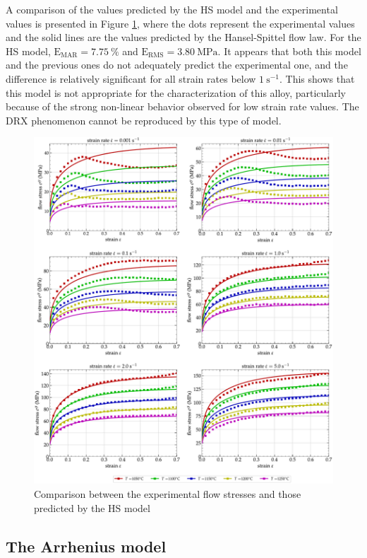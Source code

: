 \documentclass[twoside,english,1p,final,sort&compress]{elsarticle}
\theoremstyle{plain}
\DeclareRobustCommand{\RMSE}{\text{E}_\text{RMS}}
\DeclareRobustCommand{\MARE}{\text{E}_\text{MAR}}
\DeclareRobustCommand{\ps}{\text{s}^{-1}}
\DeclareRobustCommand{\MPa}{\text{MPa}}
\begin{document}
A comparison of the values predicted by the HS model and the experimental values is presented in Figure \ref{fig:CompExp-HS-6}, where the dots represent the experimental values and the solid lines are the values predicted by the Hansel-Spittel flow law.
For the HS model, $\MARE=7.75~\%$ and $\RMSE=3.80~\MPa$.
It appears that both this model and the previous ones do not adequately predict the experimental one, and the difference is relatively significant for all strain rates below $1~\ps$.
This shows that this model is not appropriate for the characterization of this alloy, particularly because of the strong non-linear behavior observed for low strain rate values.
The DRX phenomenon cannot be reproduced by this type of model.

\begin{figure}[!ht]
\centering
\includegraphics[width=\columnwidth]
{Figures/CompExp-HS-6}
\caption{Comparison between the experimental flow stresses and those predicted by the HS model}
\label{fig:CompExp-HS-6}
\end{figure}

\subsection{The Arrhenius model\label{sec:ARmodel}}
\end{document}
